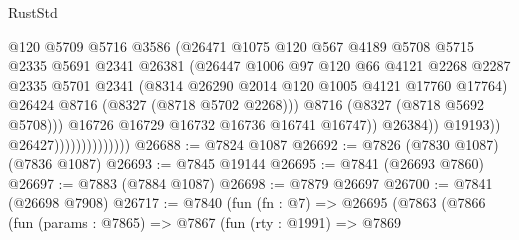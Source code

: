 \begin{lexlean}{RustStd}
\begin{coremodule}
{\begin{coremodule}
{{{{{{{{{{{{{{{{{{{{{{{{{{{{{{{{{{{{{{{{{{{{{{{{{{{{{{                                            @120
                                            @5709
                                            @5716
                                            @3586
                                            (@26471
                                              @1075
                                              @120
                                              @567
                                              @4189
                                              @5708
                                              @5715
                                              @2335
                                              @5691
                                              @2341
                                              @26381
                                              (@26447
                                                @1006
                                                @97
                                                @120
                                                @66
                                                @4121
                                                @2268
                                                @2287
                                                @2335
                                                @5701
                                                @2341
                                                (@8314 @26290 @2014 @120 @1005 @4121 @17760 @17764)
                                                @26424
                                                @8716
                                                (@8327 (@8718 @5702 @2268)))
                                              @8716
                                              (@8327 (@8718 @5692 @5708)))
                                            @16726
                                            @16729
                                            @16732
                                            @16736
                                            @16741
                                            @16747))
                                        @26384))
                                    @19193))
                                @26427))))))))))))))
@26688 := @7824 @1087
@26692 := @7826 (@7830 @1087) (@7836 @1087)
@26693 := @7845 @19144
@26695 := @7841 (@26693 @7860)
@26697 := @7883 (@7884 @1087)
@26698 := @7879 @26697
@26700 := @7841 (@26698 @7908)
@26717 := @7840
    (fun (fn : @7) =>
    @26695
      (@7863
        (@7866
          (fun (params : @7865) =>
          @7867
            (fun (rty : @1991) =>
            @7869
}}}}}}}}}}}}}}}}}}}}}}}}}}}}}}}}}}}}}}}}}}}}}}}}}}}}}}
\end{coremodule}}
\end{coremodule}
\end{lexlean}

